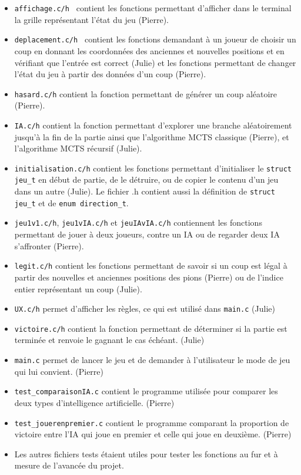 \documentclass{article}
\begin{document}
\begin{itemize}
    \item {\tt affichage.c/h } contient les fonctions permettant d'afficher dans le terminal la grille représentant l'état du jeu (Pierre).
    \item {\tt deplacement.c/h } contient les fonctions demandant à un joueur de choisir un coup en donnant les coordonnées des anciennes et nouvelles positions et en vérifiant que l'entrée est correct (Julie) et les fonctions permettant de changer l'état du jeu à partir des données d'un coup (Pierre).
    \item {\tt hasard.c/h} contient la fonction permettant de générer un coup aléatoire (Pierre).
    \item {\tt IA.c/h} contient la fonction permettant d'explorer une branche aléatoirement jusqu'à la fin de la partie ainsi que l'algorithme MCTS classique (Pierre), et l'algorithme MCTS récursif (Julie).
    \item {\tt initialisation.c/h} contient les fonctions permettant d'initialiser le {\tt struct jeu\_t} en début de partie, de le détruire, ou de copier le contenu d'un jeu dans un autre (Julie). Le fichier .h contient aussi la définition de {\tt struct jeu\_t} et de {\tt enum direction\_t}.
    \item {\tt jeu1v1.c/h}, {\tt jeu1vIA.c/h} et {\tt jeuIAvIA.c/h} contiennent les fonctions permettant de jouer à deux joueurs, contre un IA ou de regarder deux IA s'affronter (Pierre).
    \item {\tt legit.c/h} contient les fonctions permettant de savoir si un coup est légal à partir des nouvelles et anciennes positions des pions (Pierre) ou de l'indice entier représentant un coup (Julie).
    \item {\tt UX.c/h} permet d'afficher les règles, ce qui est utilisé dans {\tt main.c} (Julie)
    \item {\tt victoire.c/h} contient la fonction permettant de déterminer si la partie est terminée et renvoie le gagnant le cas échéant. (Julie)

    \item {\tt main.c} permet de lancer le jeu et de demander à l'utilisateur le mode de jeu qui lui convient. (Pierre)
    \item {\tt test\_comparaisonIA.c} contient le programme utilisée pour comparer les deux types d'intelligence artificielle. (Pierre)
    \item {\tt test\_jouerenpremier.c} contient le programme comparant la proportion de victoire entre l'IA qui joue en premier et celle qui joue en deuxième. (Pierre)
    \item Les autres fichiers tests étaient utiles pour tester les fonctions au fur et à mesure de l'avancée du projet.
\end{itemize}
\end{document}
